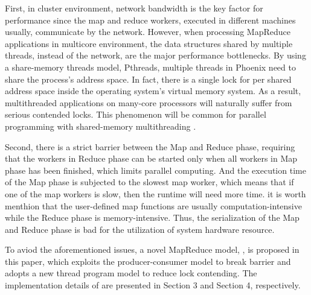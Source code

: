 First, in cluster environment, network bandwidth is the key factor for performance since the map and reduce workers, executed in different machines usually, communicate by the network.
However, when processing MapReduce applications in multicore environment, the data structures shared by multiple threads, instead of the network, are the major performance bottlenecks.
By using  a share-memory threads model, Pthreads, multiple threads in Phoenix need to share the process's address space\cite{linux}.
In fact, there is a single lock for per shared address space inside the operating system’s virtual memory system. 
As a result, multithreaded applications on many-core processors will naturally suffer from serious contended locks.
This phenomenon will be common for parallel programming with shared-memory multithreading \cite{clements2013radixvm}.


Second, there is a strict barrier between the Map and Reduce phase, requiring that the workers in Reduce phase can be started only when all workers in Map phase has been finished, 
which limits parallel computing.
And the execution time of the Map phase is subjected to the slowest map worker, which means that if one of the map workers is slow, then the runtime will need more time.
it is worth menthion that the user-defined map functions are usually computation-intensive while the Reduce phase is memory-intensive. Thus, the serialization of the Map and Reduce phase is bad for the utilization of system hardware resource.

To aviod the aforementioned issues, a novel MapReduce model, \myds,  is proposed in this paper,
which exploits the producer-consumer model to break barrier and adopts a new thread program model to reduce lock contending.
The implementation details of \myds are presented in Section 3 and Section 4, respectively.  








